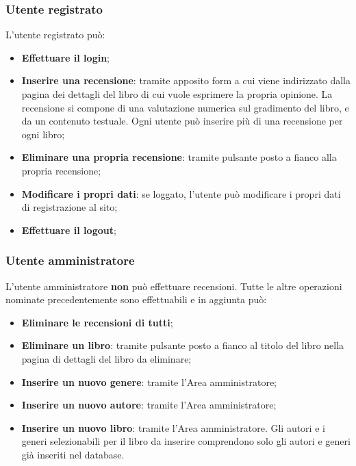 \documentclass[12pt,a4paper,headings=optiontohead]{article}
\begin{document}
	\subsubsection{Utente registrato}
	
	L'utente registrato può:
	\begin{itemize}
		\item \textbf{Effettuare il login};
		\item \textbf{Inserire una recensione}: tramite apposito form a cui viene indirizzato dalla pagina dei dettagli del libro di cui vuole esprimere la propria opinione. La recensione si compone di una valutazione numerica sul gradimento del libro, e da un contenuto testuale. Ogni utente può inserire più di una recensione per ogni libro;
		\item \textbf{Eliminare una propria recensione}: tramite pulsante posto a fianco alla propria recensione;
		\item \textbf{Modificare i propri dati}: se loggato, l'utente può modificare i propri dati di registrazione al sito;
		\item \textbf{Effettuare il logout};
	\end{itemize}

	\subsubsection{Utente amministratore}

	L'utente amministratore \textbf{non} può effettuare recensioni. Tutte le altre operazioni nominate precedentemente sono effettuabili e in aggiunta può:
	\begin{itemize}
		\item \textbf{Eliminare le recensioni di tutti};
		\item \textbf{Eliminare un libro}: tramite pulsante posto a fianco al titolo del libro nella pagina di dettagli del libro da eliminare;
		\item \textbf{Inserire un nuovo genere}: tramite l'Area amministratore;
		\item \textbf{Inserire un nuovo autore}: tramite l'Area amministratore;
		\item \textbf{Inserire un nuovo libro}: tramite l'Area amministratore. Gli autori e i generi selezionabili per il libro da inserire comprendono solo gli autori e generi già inseriti nel database.
	\end{itemize}
	
	
	
	
	
\end{document}

